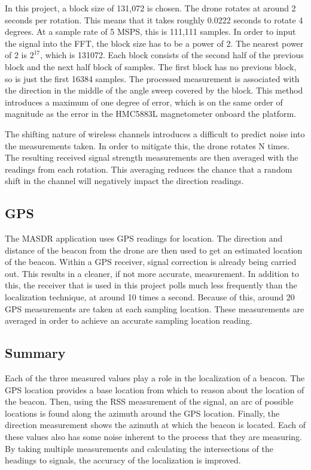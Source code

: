 In this project, a block size of 131,072 is chosen. The drone rotates at around 2 seconds per rotation. This means that it takes roughly 0.0222 seconds to rotate 4 degrees. At a sample rate of 5 MSPS, this is 111,111 samples. In order to input the signal into the FFT, the block size has to be a power of 2. The nearest power of 2 is $2^{17}$, which is 131072. Each block consists of the second half of the previous block and the next half block of samples. The first block has no previous block, so is just the first 16384 samples. The processed measurement is associated with the direction in the middle of the angle sweep covered by the block. This method introduces a maximum of one degree of error, which is on the same order of magnitude as the error in the HMC5883L magnetometer onboard the platform\cite{magnetometer_data}. \par 
The shifting nature of wireless channels introduces a difficult to predict noise into the measurements taken. In order to mitigate this, the drone rotates N times. The resulting received signal strength measurements are then averaged with the readings from each rotation. This averaging reduces the chance that a random shift in the channel will negatively impact the direction readings. \par 
\subsection{GPS}
The MASDR application uses GPS readings for location. The direction and distance of the beacon from the drone are then used to get an estimated location of the beacon. 
Within a GPS receiver, signal correction is already being carried out. This results in a cleaner, if not more accurate, measurement. In addition to this, the receiver that is used in this project polls much less frequently than the localization technique, at around 10 times a second. Because of this, around 20 GPS measurements are taken at each sampling location. These measurements are averaged in order to achieve an accurate sampling location reading.\par 
\subsection{Summary}
Each of the three measured values play a role in the localization of a beacon. The GPS location provides a base location from which to reason about the location of the beacon. Then, using the RSS measurement of the signal, an arc of possible locations is found along the azimuth around the GPS location. Finally, the direction measurement shows the azimuth at which the beacon is located. Each of these values also has some noise inherent to the process that they are measuring. By taking multiple measurements and calculating the intersections of the headings to signals, the accuracy of the localization is improved.

